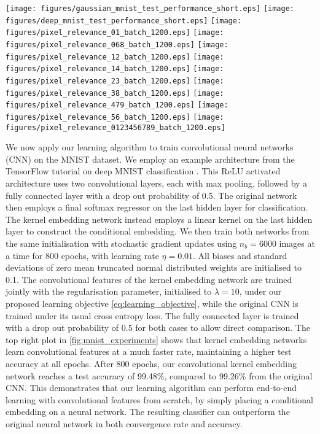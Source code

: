 \documentclass[twoside]{article}
\begin{document}
	\begin{figure*}[t]
		\centering 
		\texttt{[image: figures/gaussian\_mnist\_test\_performance\_short.eps]}
		\texttt{[image: figures/deep\_mnist\_test\_performance\_short.eps]}
		\texttt{[image: figures/pixel\_relevance\_01\_batch\_1200.eps]}
		\texttt{[image: figures/pixel\_relevance\_068\_batch\_1200.eps]}
		\texttt{[image: figures/pixel\_relevance\_12\_batch\_1200.eps]}
		\texttt{[image: figures/pixel\_relevance\_14\_batch\_1200.eps]}
		\texttt{[image: figures/pixel\_relevance\_23\_batch\_1200.eps]}
		\texttt{[image: figures/pixel\_relevance\_38\_batch\_1200.eps]}
		\texttt{[image: figures/pixel\_relevance\_479\_batch\_1200.eps]}
		\texttt{[image: figures/pixel\_relevance\_56\_batch\_1200.eps]}
		\texttt{[image: figures/pixel\_relevance\_0123456789\_batch\_1200.eps]}
		\caption{Top: Test accuracy and cross entropy loss by learning Gaussian kernels (left) and deep convolutional features (right). Bottom: Learned pixel length scales under Gaussian kernels.}
		\label{fig:mnist_experiments}
	\end{figure*}
	
	We now apply our learning algorithm to train convolutional neural networks (CNN) on the MNIST dataset. We employ an example architecture from the TensorFlow tutorial on deep MNIST classification \citep{abadi2016tensorflow}. This ReLU activated architecture uses two convolutional layers, each with max pooling, followed by a fully connected layer with a drop out probability of 0.5. The original network then employs a final softmax regressor on the last hidden layer for classification. The kernel embedding network instead employs a linear kernel on the last hidden layer to construct the conditional embedding. We then train both networks from the same initialisation with stochastic gradient updates using $n_{b} = 6000$ images at a time for 800 epochs, with learning rate $\eta = 0.01$. All biases and standard deviations of zero mean truncated normal distributed weights are initialised to 0.1. The convolutional features of the kernel embedding network are trained jointly with the regularisation parameter, initialised to $\lambda = 10$, under our proposed learning objective \eqref{eq:learning_objective}, while the original CNN is trained under its usual cross entropy loss. The fully connected layer is trained with a drop out probability of 0.5 for both cases to allow direct comparison. The top right plot in \cref{fig:mnist_experiments} shows that kernel embedding networks learn convolutional features at a much faster rate, maintaining a higher test accuracy at all epochs. After 800 epochs, our convolutional kernel embedding network reaches a test accuracy of 99.48\%, compared to 99.26\% from the original CNN. This demonstrates that our learning algorithm can perform end-to-end learning with convolutional features from scratch, by simply placing a conditional embedding on a neural network. The resulting classifier can outperform the original neural network in both convergence rate and accuracy.
	
\end{document}
